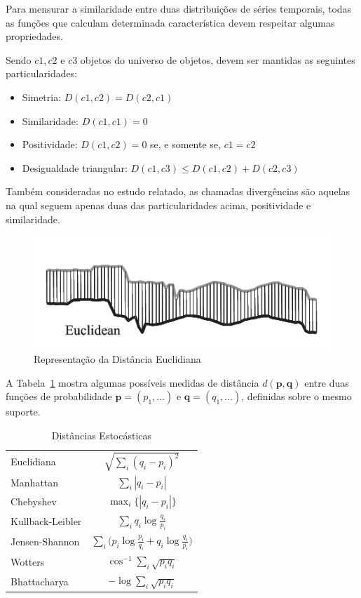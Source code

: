 Para mensurar a similaridade entre duas distribuições de séries temporais, todas as funções que calculam determinada característica devem respeitar algumas propriedades. 

Sendo $c1, c2$ e $c3$ objetos do universo de objetos, devem ser mantidas as seguintes particularidades:

\begin{itemize}

	\item Simetria:
	$D(c1,c2) = D(c2,c1)$
	\item Similaridade:
	$D(c1,c1) = 0$
	\item Positividade:
	$D(c1,c2) = 0$ se, e somente se, $c1 = c2$
	\item Desigualdade triangular:
	$D(c1,c3) \leq D(c1,c2) + D(c2,c3)$

\end{itemize}

Também consideradas no estudo relatado, as chamadas divergências são aquelas na qual seguem apenas duas das particularidades acima, positividade e similaridade.

\begin{figure}[!hbt]
	\begin{center}
		\includegraphics[width=0.7\columnwidth]{imagens/distance.png}
        \caption{Representação da Distância Euclidiana}
	\end{center}
\end{figure}

A Tabela~\ref{Tab:Distancias} mostra algumas possíveis medidas de distância $d(\bm p,\bm q)$ entre duas funções de probabilidade $\bm p=(p_1,\dots)$ e $\bm q=(q_1,\dots)$, definidas sobre o mesmo suporte.

\begin{table}[hbt]
\caption{Distâncias Estocásticas}\label{Tab:Distancias}
\centering
\begin{tabular}{lc}\toprule
Euclidiana					& $ \sqrt{\sum_i(q_i-p_i)^{2}}$\\
Manhattan					& $ \sum_{i}|q_i-p_i|$\\
Chebyshev					& $ \max_i\{|q_i-p_i|\}$\\
Kullback-Leibler			& $ \sum_{i}q_i \log\frac{q_i}{p_i}$\\
Jensen-Shannon				& $ \sum_{i} \Big(p_i \log\frac{p_i}{q_i} + q_i \log\frac{q_i}{p_i}\Big)$\\
Wotters						& $ \cos^{-1}\sum_{i} \sqrt{p_i q_i}$ \\
Bhattacharya				& $ -\log\sum_{i}\sqrt{p_i q_i}$ \\
\bottomrule
\end{tabular}
\end{table}

